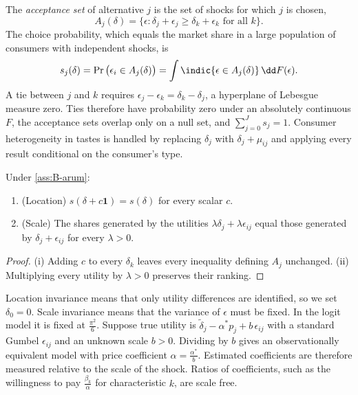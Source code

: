 The \emph{acceptance set} of alternative $j$ is the set of shocks for which $j$ is chosen,
\begin{equation*}
A_j(\delta) = \big\{\epsilon : \delta_j + \epsilon_j \geq \delta_k + \epsilon_k \text{ for all } k\big\}.
\end{equation*}
The choice probability, which equals the market share in a large population of consumers with independent
shocks, is
\begin{equation}\label{eq:B-share-integral}
s_j(\delta) = \Pr\big(\epsilon_i \in A_j(\delta)\big) = \int\indic\{\epsilon \in A_j(\delta)\}\,\dd F(\epsilon).
\end{equation}
A tie between $j$ and $k$ requires $\epsilon_j - \epsilon_k = \delta_k - \delta_j$, a hyperplane of Lebesgue
measure zero. Ties therefore have probability zero under an absolutely continuous $F$, the acceptance sets
overlap only on a null set, and $\sum_{j = 0}^Js_j = 1$. Consumer heterogeneity in tastes is handled by
replacing $\delta_j$ with $\delta_j + \mu_{ij}$ and applying every result conditional on the consumer's type.

\begin{proposition}[Normalizations]\label{prop:B-normalizations}
Under \cref{ass:B-arum}:
\begin{enumerate}[label=(\roman*)]
\item (Location) $s(\delta + c\mathbf{1}) = s(\delta)$ for every scalar $c$.
\item (Scale) The shares generated by the utilities $\lambda\delta_j + \lambda\epsilon_{ij}$ equal those generated by
  $\delta_j + \epsilon_{ij}$ for every $\lambda > 0$.
\end{enumerate}
\end{proposition}

\begin{proof}
(i) Adding $c$ to every $\delta_k$ leaves every inequality defining $A_j$ unchanged. (ii) Multiplying every
utility by $\lambda > 0$ preserves their ranking.
\end{proof}

Location invariance means that only utility differences are identified, so we set $\delta_0 = 0$. Scale
invariance means that the variance of $\epsilon$ must be fixed. In the logit model it is fixed at
$\frac{\pi^2}{6}$. Suppose true utility is $\tilde\delta_j - \alpha^*p_j + b\,\epsilon_{ij}$ with a standard Gumbel
$\epsilon_{ij}$ and an unknown scale $b > 0$. Dividing by $b$ gives an observationally equivalent model with price
coefficient $\alpha = \frac{\alpha^*}{b}$. Estimated coefficients are therefore measured relative to the scale of
the shock. Ratios of coefficients, such as the willingness to pay $\frac{\beta_k}{\alpha}$ for characteristic
$k$, are scale free.

